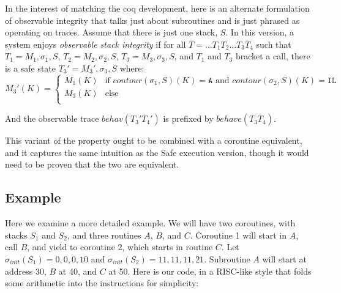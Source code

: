 \documentclass{article}
\begin{document}
      In the interest of matching the coq development, here is an alternate formulation of observable integrity
      that talks just about subroutines and is just phrased as operating on traces. Assume that there is just
      one stack, \(S\). In this version, a system enjoys {\it observable stack integrity} if for all
      \(\overline{T} = \dots T_1 T_2 \dots T_3 \overline{T}_4\) such that \(T_1 = M_1,\sigma_1,S\), 
      \(T_2 = M_2,\sigma_2,S\), \(T_3 = M_3,\sigma_3,S\), and \(T_1\) and \(T_3\) bracket a call,
      there is a safe state \(T_3' = M_3',\sigma_3,S\) where:
      \[M_3'(K) =
      \begin{cases}
        M_1(K) & \text{if } \mathit{contour}(\sigma_1,S)(K) = \mathtt{A} \text{ and }
                 \mathit{contour}(\sigma_2,S)(K) = \mathtt{IL} \\
        M_3(K) & \text{else} \\
      \end{cases}\]

      And the observable trace \(\mathit{behav}(T_3' \overline{T}_4')\) is prefixed by
      \(\mathit{behave}(T_3 \overline{T}_4)\).

      This variant of the property ought to be combined with a coroutine equivalent, and it captures the
      same intuition as the {\sc Safe} execution version, though it would need to be proven that the two are
      equivalent.
      
  \subsection{Example}

    Here we examine a more detailed example. We will have two coroutines, with stacks \(S_1\) and \(S_2\), and
    three routines \(A\), \(B\), and \(C\). Coroutine 1 will start in \(A\), call \(B\), and yield to coroutine
    2, which starts in routine \(C\). Let \(\sigma_{init}(S_1) = 0,0,0,10\) and \(\sigma_{init}(S_2) = 11,11,11,21\).
    Subroutine \(A\) will start at address 30, \(B\) at 40, and \(C\) at 50. Here is our code, in a RISC-like style
    that folds some arithmetic into the instructions for simplicity:
\end{document}
